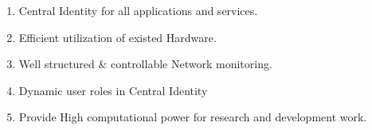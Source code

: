 \documentclass[]{article}
\begin{document}
\begin{enumerate}

\item Central Identity for all applications and services.
\item Efficient utilization of existed Hardware.
\item Well structured \& controllable Network monitoring.
\item Dynamic user roles in Central Identity
\item Provide High computational power for research and development work.

\end{enumerate}




%
%
%
%
\end{document}
